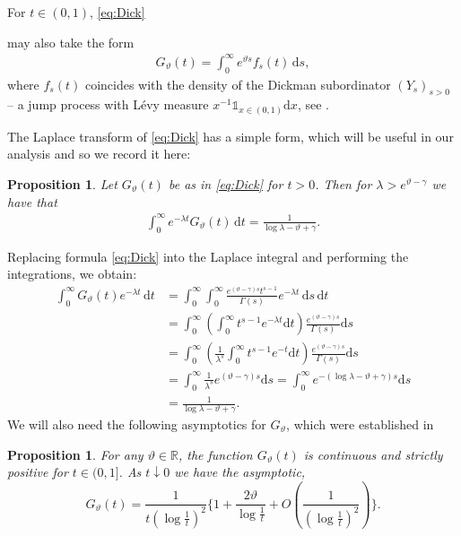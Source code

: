 \documentclass[a4paper,reqno,11pt]{amsart}
\makeatletter
\renewenvironment{proof}[1][\proofname]{\par
\pushQED{\qed}%
\normalfont \topsep4\p@\@plus4\p@\relax
\trivlist
\item[\hskip\labelsep
\bfseries
#1\@addpunct{.}]\ignorespaces
}{%
\popQED\endtrivlist\@endpefalse
}
\numberwithin{equation}{section}
\theoremstyle{mytheorem}
\newtheorem{proposition}[theorem]{Proposition}
\newcommand{\bbR}{{\ensuremath{\mathbb R}} }
\newcommand{\gt}{\vartheta}
\newcommand{\ind}{\mathds{1}}
\renewcommand{\theta}{\vartheta}
\newcommand\ra{\left(}
\newcommand\rb{\right)}
\newcommand\dd{\mathrm{d}}
\makeatother
\begin{document}
For $t\in (0,1)$, \eqref{eq:Dick} {may also take the form
\begin{align}\label{eq:Dick2}
G_\theta(t)=\int_0^\infty e^{\theta s} f_s(t) \, \dd s,
\end{align}
where $f_s(t)$ coincides with
 the density of the Dickman subordinator $(Y_s)_{s>0}$ -- a jump process with L\'evy measure 
$x^{-1} \ind_{x\in (0,1)} \dd x$, see \cite{CSZ19a}.

The Laplace transform of \eqref{eq:Dick} has a simple form, which will be useful in our analysis and so we record 
it here:
\begin{proposition}\label{LaplaceG}
Let $G_\theta(t)$ be as in \eqref{eq:Dick} for $t>0$. Then for $\lambda> e^{\theta-\gamma}$ we have that
\begin{align*}
\int_0^\infty e^{-\lambda t} G_\theta(t) \,\dd t =  \frac{1}{\log\lambda-\theta + \gamma}.
\end{align*}
\end{proposition}
\begin{proof}
Replacing formula \eqref{eq:Dick} into the Laplace integral and performing the integrations, we obtain:
\begin{align*}
        \int_0^\infty G_\theta(t) e^{-\lambda t} \,\dd t
        & = \int_0^\infty \int_0^\infty  \frac{e^{(\theta-\gamma) s} t^{s-1}}{\Gamma(s)} e^{-\lambda t} \,\dd s \,\dd t \\
        & = \int_0^\infty  \left( \int_0^\infty   t^{s-1} e^{-\lambda t} \dd t \right)
        \frac{e^{(\theta-\gamma) s} }{\Gamma(s)} \dd s \\
        & = \int_0^\infty  \left(  \frac{1}{\lambda^s}\int_0^\infty  t^{s-1} e^{-t}  \dd t \right)
        \frac{e^{(\theta-\gamma) s} }{\Gamma(s)} \dd s \\
        & = \int^\infty_0\frac{1}{\lambda^s} e^{(\theta-\gamma) s}   \dd s 
        = \int^\infty_0 e^{-(\log\lambda-\theta +\gamma)s} \dd s \\
        &= \frac{1}{\log\lambda-\theta + \gamma}.
\end{align*}
\end{proof}
We will also need the following asymptotics for $G_\theta$, which were established in \cite{CSZ19a}
 \begin{proposition}\label{asymptotic of G}
        For any $\gt\in\bbR$, the function $G_\gt(t)$ is continuous and strictly positive for $t\in(0,1]$. As $t\downarrow 0$ we have the asymptotic,
        $$
        G_\gt(t)=\frac{1}{t(\log\frac{1}{t})^2}\bigg\{ 1+\frac{2\gt}{\log\frac{1}{t}}
        +O\ra \frac{1}{(\log\frac{1}{t})^2} \rb \bigg\}.
        $$
    \end{proposition}

}
\end{document}

